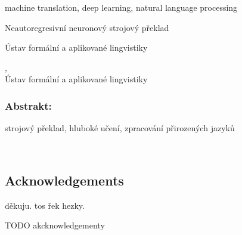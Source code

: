 \documentclass[12pt,notitlepage,a4paper,openright]{report}
\begin{document}


\begin{description}[leftmargin=7.5em,labelwidth=7em,labelindent=0em,labelsep=0.5em]
\item[Keywords:] machine translation, deep learning, natural language processing
\end{description}


\cleardoublepage{}
\begin{description}[leftmargin=7.5em,labelwidth=7em,labelindent=0em,labelsep=0.5em]
\item[Název práce:] Neautoregresivní neuronový strojový překlad
\item[Autor:] \theauthor{}
\item[Katedra:] Ústav formální a aplikované lingvistiky
\item[Vedoucí práce:] \thesupervisor,\\ Ústav formální a aplikované lingvistiky
\end{description}

\subsubsection{Abstrakt:}



\begin{description}[leftmargin=7.5em,labelwidth=7em,labelindent=0em,labelsep=0.5em]
%
\item[Klíčová slova:] strojový překlad, hluboké učení, zpracování přirozených jazyků
%
\end{description}





\cleardoublepage{}
\ \vspace{10mm}

\subsection*{Acknowledgements}

{
  děkuju. tos řek hezky.
}

\vfill


{\noindent\footnotesize TODO akcknowledgementy}

\cleardoublepage{}
\tableofcontents %
\end{document}
